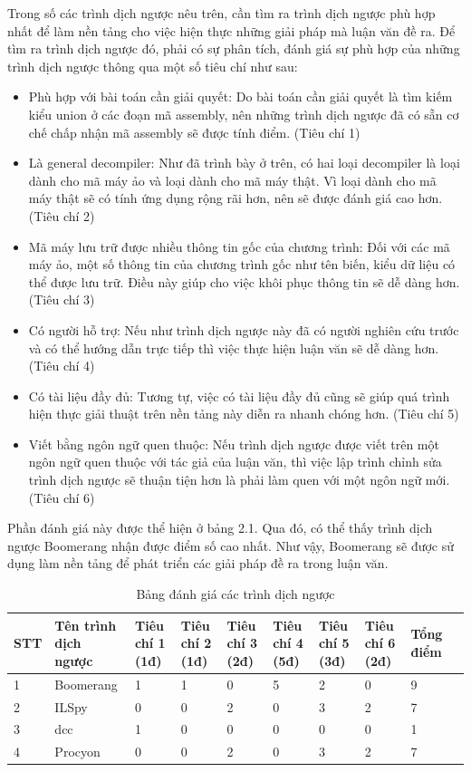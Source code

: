 Trong số các trình dịch ngược nêu trên, cần tìm ra trình dịch ngược phù hợp nhất để làm nền tảng cho việc hiện thực những giải pháp mà luận văn đề ra. Để tìm ra trình dịch ngược đó, phải có sự phân tích, đánh giá sự phù hợp của những trình dịch ngược thông qua một số tiêu chí như sau:
\begin{itemize}
	\item Phù hợp với bài toán cần giải quyết: Do bài toán cần giải quyết là tìm kiếm kiểu union ở các đoạn mã assembly, nên những trình dịch ngược đã có sẵn cơ chế chấp nhận mã assembly sẽ được tính điểm. (Tiêu chí 1)
	\item Là general decompiler: Như đã trình bày ở trên, có hai loại decompiler là loại dành cho mã máy ảo và loại dành cho mã máy thật. Vì loại dành cho mã máy thật sẽ có tính ứng dụng rộng rãi hơn, nên sẽ được đánh giá cao hơn. (Tiêu chí 2)
	\item Mã máy lưu trữ được nhiều thông tin gốc của chương trình: Đối với các mã máy ảo, một số thông tin của chương trình gốc như tên biến, kiểu dữ liệu có thể được lưu trữ. Điều này giúp cho việc khôi phục thông tin sẽ dễ dàng hơn. (Tiêu chí 3)
	\item Có người hỗ trợ: Nếu như trình dịch ngược này đã có người nghiên cứu trước và có thể hướng dẫn trực tiếp thì việc thực hiện luận văn sẽ dễ dàng hơn. (Tiêu chí 4)
	\item Có tài liệu đầy đủ: Tương tự, việc có tài liệu đầy đủ cũng sẽ giúp quá trình hiện thực giải thuật trên nền tảng này diễn ra nhanh chóng hơn. (Tiêu chí 5)
	\item Viết bằng ngôn ngữ quen thuộc: Nếu trình dịch ngược được viết trên một ngôn ngữ quen thuộc với tác giả của luận văn, thì việc lập trình chỉnh sửa trình dịch ngược sẽ thuận tiện hơn là phải làm quen với một ngôn ngữ mới. (Tiêu chí 6)
\end{itemize}
Phần đánh giá này được thể hiện ở bảng 2.1. Qua đó, có thể thấy trình dịch ngược Boomerang nhận được điểm số cao nhất. Như vậy, Boomerang sẽ được sử dụng làm nền tảng để phát triển các giải pháp đề ra trong luận văn.
\begin{table}[h!]
	\centering
	\begin{tabular}{ |p{0.7cm}| p{2cm}| p{1.5cm}| p{1.5cm}| p{2cm}| p{1.5cm}| p{1.5cm}
			| p{1.5cm}| p{1.5cm}| p{1.5cm}| }
	\hline
		
		STT & Tên trình dịch ngược & Tiêu chí 1 (1đ) & Tiêu chí 2 (1đ) & Tiêu chí 3 (2đ) & Tiêu chí 4 (5đ) & Tiêu chí 5 (3đ) & Tiêu chí 6 (2đ) & Tổng điểm\\
		\hline
		1 & Boomerang & 1 & 1 &0 & 5 & 2 & 0 & 9\\
	\hline
		2 & ILSpy & 0 & 0 & 2 & 0& 3 & 2 & 7\\
		\hline
		3 & dcc & 1 &0&0&0&0&0&1\\
		\hline
		4&Procyon&0&0&2&0&3&2&7\\
		\hline
	\end{tabular}


\label{table:abc}
	\caption{Bảng đánh giá các trình dịch ngược}
\end{table}


